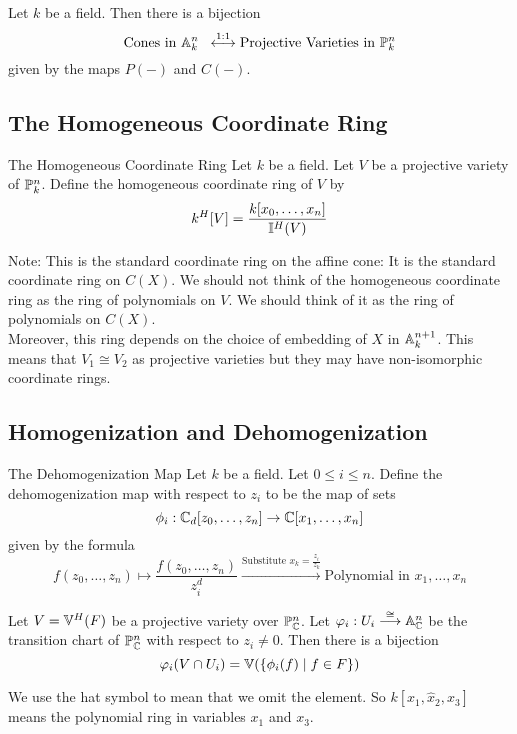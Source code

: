 \documentclass[a4paper]{article}
\begin{document}
\begin{prp}{}{} Let $k$ be a field. Then there is a bijection $$\text{Cones in }\mathbb{A}_k^n\;\;\overset{1:1}{\longleftrightarrow}\text{Projective Varieties in }\mathbb{P}_k^n$$ given by the maps $P(-)$ and $C(-)$. 
\end{prp}

\subsection{The Homogeneous Coordinate Ring}
\begin{defn}{The Homogeneous Coordinate Ring}{} Let $k$ be a field. Let $V$ be a projective variety of $\mathbb{P}_k^n$. Define the homogeneous coordinate ring of $V$ by $$k^H[V]=\frac{k[x_0,\dots,x_n]}{\mathbb{I}^H(V)}$$
\end{defn}

Note: This is the standard coordinate ring on the affine cone: It is the standard coordinate ring on $C(X)$. We should not think of the homogeneous coordinate ring as the ring of polynomials on $V$. We should think of it as the ring of polynomials on $C(X)$. \\

Moreover, this ring depends on the choice of embedding of $X$ in $\mathbb{A}_k^{n+1}$. This means that $V_1\cong V_2$ as projective varieties but they may have non-isomorphic coordinate rings. 

\subsection{Homogenization and Dehomogenization}
\begin{defn}{The Dehomogenization Map}{} Let $k$ be a field. Let $0\leq i\leq n$. Define the dehomogenization map with respect to $z_i$ to be the map of sets $$\phi_i:\mathbb{C}_d[z_0,\dots,z_n]\to\mathbb{C}[x_1,\dots,x_n]$$ given by the formula $$f(z_0,\dots,z_n)\mapsto\frac{f(z_0,\dots,z_n)}{z_i^d}\overset{\text{Substitute }x_k=\frac{z_i}{z_k}}{\longrightarrow}\text{Polynomial in }x_1,\dots,x_n$$
\end{defn}

\begin{prp}{}{} Let $V=\mathbb{V}^H(F)$ be a projective variety over $\mathbb{P}_{\mathbb{C}}^n$. Let $\varphi_i:U_i\overset{\cong}{\longrightarrow}\mathbb{A}_{\mathbb{C}}^n$ be the transition chart of $\mathbb{P}_{\mathbb{C}}^n$ with respect to $z_i\neq 0$. Then there is a bijection $$\varphi_i(V\cap U_i)=\mathbb{V}(\{\phi_i(f)\;|\;f\in F\})$$
\end{prp}

We use the hat symbol to mean that we omit the element. So $k[x_1,\hat{x}_2,x_3]$ means the polynomial ring in variables $x_1$ and $x_3$. 
\end{document}

